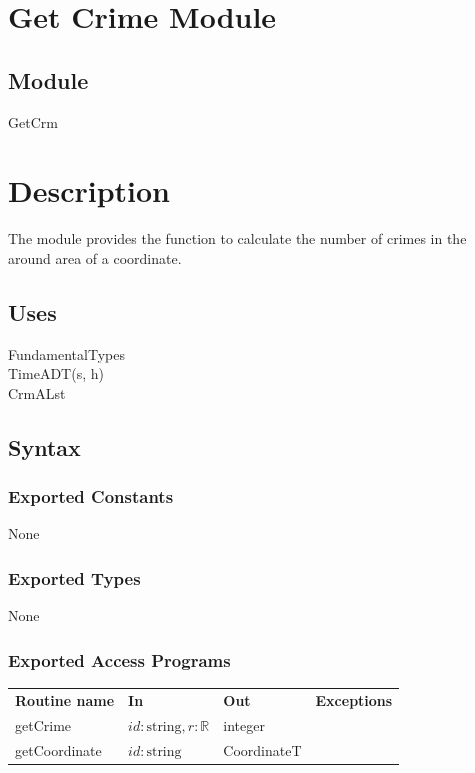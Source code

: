 \documentclass[12pt]{article}
\begin{document}
\section* {Get Crime Module}

\subsection*{Module}

GetCrm

\section* {Description}
The module provides the function to calculate the number of crimes in the around area of a coordinate.

\subsection* {Uses}

FundamentalTypes\\
TimeADT(s, h)\\
CrmALst

\subsection* {Syntax}

\subsubsection* {Exported Constants}

None

\subsubsection* {Exported Types}

None

\subsubsection* {Exported Access Programs}
\begin{tabular}{| l | l | l | l |}
\hline
\textbf{Routine name} & \textbf{In} & \textbf{Out} & \textbf{Exceptions}\\
getCrime & $id: \mbox{string}, r: \mathbb{R} $& integer & ~\\
\hline
getCoordinate & $id: \mbox{string} $& CoordinateT & ~\\
\hline
\end{tabular}
\end{document}
